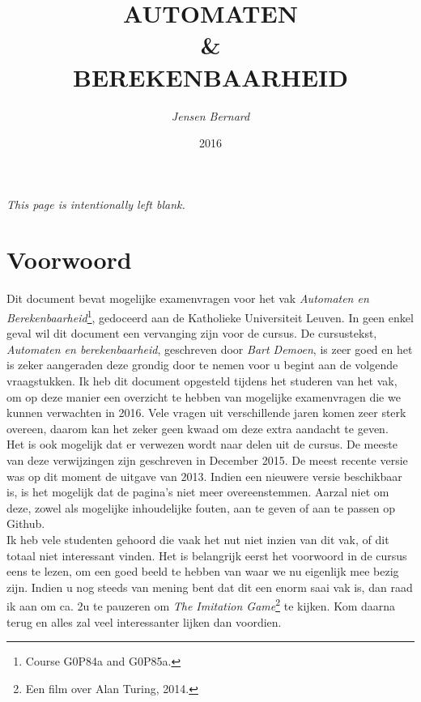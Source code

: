 \documentclass[10pt,a4paper]{article}
\title{AUTOMATEN \\ \& \\ BEREKENBAARHEID}
\author{\emph{Jensen Bernard}}
\date{2016}
\begin{document}
\sloppy

\clearpage
\thispagestyle{empty}
\maketitle
\newpage

\begin{center}
	\emph{This page is intentionally left blank.}
\end{center}

\newpage
\section*{Voorwoord}

Dit document bevat mogelijke examenvragen voor het vak \emph{Automaten en Berekenbaarheid}\footnote{Course G0P84a and G0P85a.}, gedoceerd aan de Katholieke Universiteit Leuven. In geen enkel geval wil dit document een vervanging zijn voor de cursus. De cursustekst, \emph{Automaten en berekenbaarheid}, geschreven door \emph{Bart Demoen}, is zeer goed en het is zeker aangeraden deze grondig door te nemen voor u begint aan de volgende vraagstukken.
Ik heb dit document opgesteld tijdens het studeren van het vak, om op deze manier een overzicht te hebben van mogelijke examenvragen die we kunnen verwachten in 2016. Vele vragen uit verschillende jaren komen zeer sterk overeen, daarom kan het zeker geen kwaad om deze extra aandacht te geven.
\\

Het is ook mogelijk dat er verwezen wordt naar delen uit de cursus. De meeste van deze verwijzingen zijn geschreven in December 2015. De meest recente versie was op dit moment de uitgave van 2013. Indien een nieuwere versie beschikbaar is, is het mogelijk dat de pagina's niet meer overeenstemmen. Aarzal niet om deze, zowel als mogelijke inhoudelijke fouten, aan te geven of aan te passen op Github.
\\

Ik heb vele studenten gehoord die vaak het nut niet inzien van dit vak, of dit totaal niet interessant vinden. Het is belangrijk eerst het voorwoord in de cursus eens te lezen, om een goed beeld te hebben van waar we nu eigenlijk mee bezig zijn. Indien u nog steeds van mening bent dat dit een enorm saai vak is, dan raad ik aan om ca. 2u te pauzeren om \emph{The Imitation Game}\footnote{Een film over Alan Turing, 2014.} te kijken. Kom daarna terug en alles zal veel interessanter lijken dan voordien.
\\
\end{document}
